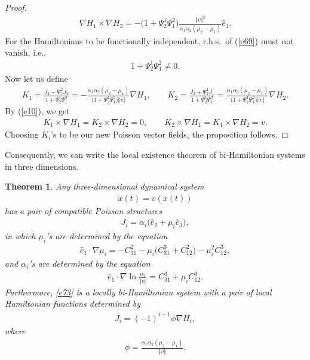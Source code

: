 \documentclass[pdftex]{sigma}
\numberwithin{equation}{section}
\newtheorem{Theorem}{Theorem}[section]
\begin{document}
\begin{proof}
\begin{gather}
\nabla H_{1}\times \nabla H_{2}=-\big( 1+\Psi _{2}^{1}\Psi _{1}^{2}\big) \frac{\Vert v\Vert ^{2}}{\alpha _{1}\alpha _{2} ( \mu_{2}-\mu_{1} ) }\widehat{e}_{1}. \label{e69}
\end{gather}
For the Hamiltonians to be functionally independent, r.h.s.\ of (\ref{e69}) must not vanish, i.e.,
\begin{gather*}
1+\Psi _{2}^{1}\Psi _{1}^{2}\neq 0.
\end{gather*}
Now let us def\/ine
\begin{gather*}
K_{1} = \frac{J_{1}-\Psi _{1}^{2}J_{2}}{1+\Psi _{2}^{1}\Psi _{1}^{2}} = -\frac{\alpha _{1}\alpha _{2}(\mu _{2}-\mu _{1}) }{\big(1+\Psi _{2}^{1}\Psi _{1}^{2}\big) \Vert v\Vert }\nabla H_{1}, \qquad
K_{2} = \frac{J_{2}+\Psi _{2}^{1}J_{1}}{1+\Psi _{2}^{1}\Psi _{1}^{2}} = \frac{\alpha _{1}\alpha _{2}(\mu _{2}-\mu _{1}) }{\big(1+\Psi
_{2}^{1}\Psi _{1}^{2}\big) \Vert v\Vert }\nabla H_{2}.
\end{gather*}
By (\ref{e10}), we get
\begin{gather*} %
K_{1}\times \nabla H_{1} = K_{2}\times \nabla H_{2} = 0, \qquad
K_{2}\times \nabla H_{1} = K_{1}\times \nabla H_{2} = v.
\end{gather*}
Choosing $K_{i}$'s to be our new Poisson vector f\/ields, the proposition follows.
\end{proof}

Consequently, we can write the local existence theorem of bi-Hamiltonian systems in three dimensions.

\begin{Theorem}\label{theorem1}Any three-dimensional dynamical system
\begin{gather}
\dot{x}(t) =v ( x(t) )\label{e73}
\end{gather}
has a pair of compatible Poisson structures
\begin{gather*}
J_{i}=\alpha _{i}\big( \widehat{e}_{2}+\mu _{i}\widehat{e}_{3}\big),
\end{gather*}
in which $\mu _{i}$'s are determined by the equation
\begin{gather*}
\widehat{e}_{1}\cdot \nabla \mu _{i}=-C_{31}^{2}-\mu _{i}\big(C_{31}^{3}+C_{12}^{2}\big) -\mu _{i}^{2}C_{12}^{3},
\end{gather*}
and $\alpha _{i}$'s are determined by the equation
\begin{gather*}
\widehat{e}_{1}\cdot \nabla \ln \frac{\alpha _{i}}{\Vert v\Vert }=C_{31}^{3}+\mu _{i}C_{12}^{3}.
\end{gather*}
Furthermore, \eqref{e73} is a locally bi-Hamiltonian system with a pair of local Hamiltonian functions determined by
\begin{gather}
J_{i}= ( -1 ) ^{i+1}\phi \nabla H_{i}, \label{e77}
\end{gather}
where
\begin{gather}
\phi =\frac{\alpha _{1}\alpha _{2} ( \mu _{2}-\mu _{1} ) }{\Vert v\Vert }. \label{e78}
\end{gather}
\end{Theorem}
\end{document}

